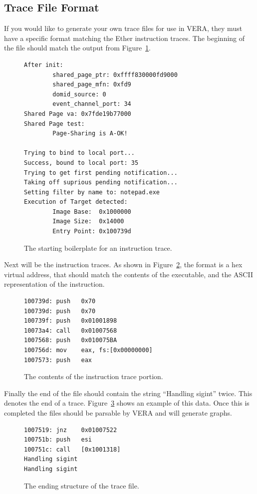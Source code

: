 \documentclass[11pt]{article}
\begin{document}
\subsection{Trace File Format}

If you would like to generate your own trace files for use in VERA,
they must have a specific format matching the Ether instruction
traces. The beginning of the file should match the output from
Figure~\ref{fig:boilerplate}. 

\begin{figure}[htb]
\centering
\begin{verbatim}
After init:
        shared_page_ptr: 0xffff830000fd9000
        shared_page_mfn: 0xfd9
        domid_source: 0
        event_channel_port: 34
Shared Page va: 0x7fde19b77000
Shared Page test:
        Page-Sharing is A-OK!

Trying to bind to local port...
Success, bound to local port: 35
Trying to get first pending notification...
Taking off suprious pending notification...
Setting filter by name to: notepad.exe
Execution of Target detected:
        Image Base:  0x1000000
        Image Size:  0x14000
        Entry Point: 0x100739d
\end{verbatim}
\caption{The starting boilerplate for an instruction trace.}\label{fig:boilerplate}
\end{figure}

Next will be the instruction traces. As
shown in Figure~\ref{fig:instructions}, the format is a hex virtual address,
that should match the contents of the executable, and the
ASCII representation of the instruction.  

\begin{figure}[htb]
\centering
\begin{verbatim}
100739d: push   0x70
100739d: push   0x70
100739f: push   0x01001898
10073a4: call   0x01007568
1007568: push   0x010075BA
100756d: mov    eax, fs:[0x00000000]
1007573: push   eax
\end{verbatim}
\caption{The contents of the instruction trace portion.}\label{fig:instructions}
\end{figure}

Finally the end of the file should contain the string ``Handling
sigint'' twice. This denotes the end of a trace. Figure~\ref{fig:end}
shows an example of this data. Once this is
completed the files should be parsable by VERA and will generate
graphs.

\begin{figure}[htb]
\centering
\begin{verbatim}
1007519: jnz	0x01007522
100751b: push	esi
100751c: call	[0x1001318]
Handling sigint
Handling sigint
\end{verbatim}
\caption{The ending structure of the trace file.}\label{fig:end}
\end{figure}
\end{document}
